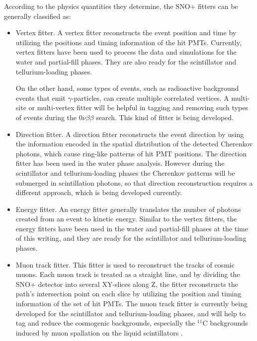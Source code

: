 According to the physics quantities they determine, the SNO+ fitters can be generally classified as:
\begin{itemize}
	\item Vertex fitter. A vertex fitter reconstructs the event position and time by utilizing the positions and timing information of the hit PMTs. Currently, vertex fitters have been used to process the data and simulations for the water and partial-fill phases. They are also ready for the scintillator and tellurium-loading phases.
	
    On the other hand, some types of events, such as radioactive background events that emit $\gamma$-particles, can create multiple correlated vertices. A multi-site or multi-vertex fitter will be helpful in tagging and removing such types of events during the $0\nu\beta\beta$ search. This kind of fitter is being developed.

	\item Direction fitter. A direction fitter reconstructs the event direction by using the information encoded in the spatial distribution of the detected Cherenkov photons, which cause ring-like patterns of hit PMT positions. The direction fitter has been used in the water phase analysis. However during the scintillator and tellurium-loading phases the Cherenkov patterns will be submerged in scintillation photons, so that direction reconstruction requires a different approach, which is being developed currently. 
	
	\item Energy fitter. An energy fitter generally translates the number of photons created from an event to kinetic energy. Similar to the vertex fitters, the energy fitters have been used in the water and partial-fill phases at the time of this writing, and they are ready for the scintillator and tellurium-loading phases.

	\item Muon track fitter. This fitter is used to reconstruct the tracks of cosmic muons. Each muon track is treated as a straight line, and by dividing the SNO+ detector into several XY-slices along Z, the fitter reconstructs the path's intersection point on each slice by utilizing the position and timing information of the set of hit PMTs\cite{muonTrackRecon}. The muon track fitter is currently being developed for the scintillator and tellurium-loading phases, and will help to tag and reduce the cosmogenic backgrounds, especially the $^{11}$C backgrounds induced by muon spallation on the liquid scintillators \cite{sorensen2016temperature}.
\end{itemize}

